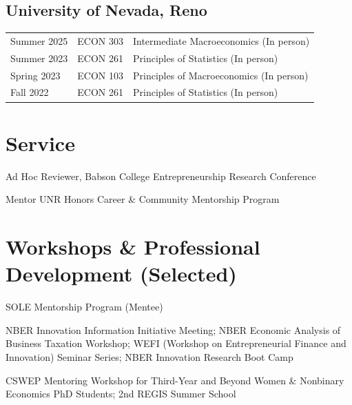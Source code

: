\documentclass[12pt,letterpaper]{report}
\begin{document}
    \subsection*{University of Nevada, Reno}
\begin{tabular}{@{}p{3.0cm}p{2.4cm}p{8.6cm}@{}}
Summer 2025 & ECON 303 & Intermediate Macroeconomics (In person) \\
Summer 2023 & ECON 261 & Principles of Statistics (In person) \\
Spring 2023 & ECON 103 & Principles of Macroeconomics (In person) \\
Fall 2022 & ECON 261 & Principles of Statistics (In person) \\
\end{tabular}

\section*{Service}
    \begin{tablist}
        \item[2026] \tab{}Ad Hoc Reviewer, Babson College Entrepreneurship Research Conference
        \item[2025] \tab{}Mentor \tab{}UNR Honors Career \& Community Mentorship Program    
    \end{tablist}
    
\section*{Workshops \& Professional Development (Selected)}
{\selectfont
\begin{tablist}
  \item[2026] \tab{}SOLE Mentorship Program (Mentee)

  \item[2025] \tab{}NBER Innovation Information Initiative Meeting; NBER Economic Analysis of Business Taxation Workshop; WEFI (Workshop on Entrepreneurial Finance and Innovation) Seminar Series; NBER Innovation Research Boot Camp

  \item[2024] \tab{}CSWEP Mentoring Workshop for Third-Year and Beyond Women \& Nonbinary Economics PhD Students; 2nd REGIS Summer School
\end{tablist}
}
\end{document}
